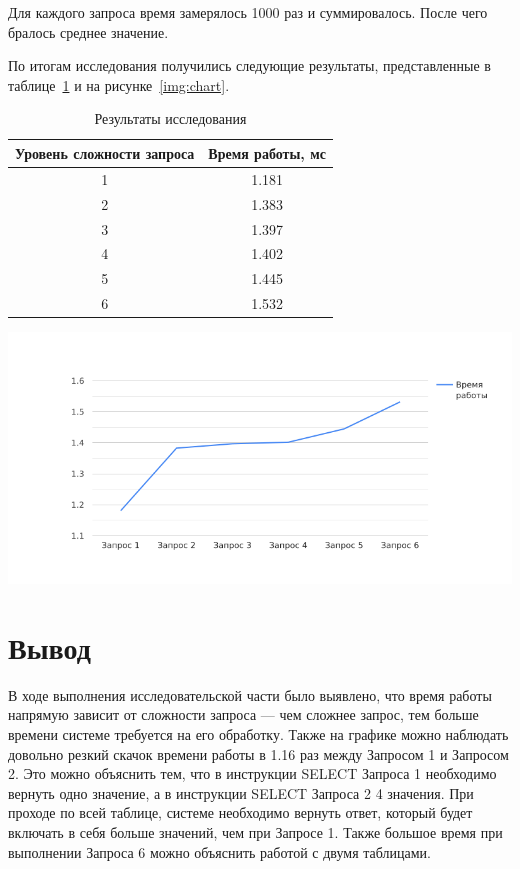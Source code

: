 Для каждого запроса время замерялось 1000 раз и суммировалось.
После чего бралось среднее значение.

По итогам исследования получились следующие результаты, представленные в таблице~\ref{table:res} и на рисунке~\ref{img:chart}.

\begin{table}[h]

	\centering
	\begin{tabular}{ | c | c | }
		\hline
		Уровень сложности запроса & Время работы, мс \\ \hline
		1 & 1.181 \\
		2 & 1.383 \\
		3 & 1.397 \\
		4 & 1.402 \\
		5 & 1.445 \\
		6 & 1.532 \\
		\hline
	\end{tabular}
	\caption{Результаты исследования}
				\label{table:res}
\end{table}


\begin{center}
	\centering
	\includegraphics[height=0.3\textheight]{inc/img/chart.png}
	\label{img:chart}
\end{center}
\section*{Вывод}
В ходе выполнения исследовательской части было выявлено, что время работы напрямую зависит от сложности запроса --- чем сложнее запрос, тем больше времени системе требуется на его обработку.
Также на графике можно наблюдать довольно резкий скачок времени работы в 1.16 раз между Запросом 1 и Запросом 2.
Это можно объяснить тем, что в инструкции SELECT Запроса 1 необходимо вернуть одно значение, а в инструкции SELECT Запроса 2 4 значения.
При проходе по всей таблице, системе необходимо вернуть ответ, который будет включать в себя больше значений, чем при Запросе 1.
Также большое время при выполнении Запроса 6 можно объяснить работой с двумя таблицами.

 